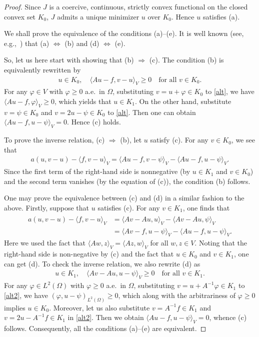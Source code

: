 \documentclass[reqno,10pt]{amsart}
\begin{document}
\begin{proof}
Since $J$ is a coercive, continuous, strictly convex
functional on the closed convex set $K_0$, $J$ admits a unique
minimizer $u$ over $K_0$. Hence $u$ satisfies (a). 

We shall prove the equivalence of the conditions (a)--(e).
It is well known (see, e.g.,~\cite{K-S80}) that (a) $\Leftrightarrow$
 (b) and (d) $\Leftrightarrow$ (e).

So, let us here start with showing that (b) $\Rightarrow$ (c). 
The condition (b) is equivalently rewritten by
\begin{align}\label{alt}
u\in K_0,
\quad
\langle Au-f,v-u\rangle_V \ge 0
\quad
\mbox{for all }v\in K_0.
\end{align}
For any $\varphi\in V$ with $\varphi\ge 0$ a.e.~in $\Omega$, 
substituting $v=u+\varphi\in K_0$ to \eqref{alt},
we have
$\langle Au-f,\varphi\rangle_V \ge 0$,
which yields that $u\in K_1$. 
On the other hand, substitute $v=\psi\in K_0$ and $v=2u-\psi\in K_0$ to
\eqref{alt}. Then one can obtain $\langle Au-f,u-\psi\rangle_V
=0$. Hence (c) holds.

To prove the inverse relation, (c) $\Rightarrow$ (b), 
let $u$ satisfy (c). For any $v\in K_0$, we see that
\begin{align*}
a(u,v-u)-\langle f,v-u\rangle_V
=
\langle Au-f,v-\psi\rangle_V
-\langle Au-f,u-\psi \rangle_V.
\end{align*}
Since the first term of the right-hand side is nonnegative (by $u \in
K_1$ and $v \in K_0$) and the second term vanishes (by the equation of (c)), the
condition (b) follows.

One may prove the equivalence between (c) and (d) in a similar fashion to
the above. Firstly, suppose that $u$ satisfies (c). For any
$v\in K_1$, one finds that
\begin{align*}
a(u,v-u)- \langle \hat{f},v-u\rangle_V
&= \langle Av - Au, u \rangle_V - \langle Av - Au, \psi \rangle_V\\
&= \langle Av-f,u-\psi\rangle_V
-\langle Au-f,u-\psi \rangle_V.
\end{align*}
Here we used the fact that $\langle Aw,z \rangle_V = \langle Az,w
 \rangle_V$ for all $w,z \in V$.
Noting that the right-hand side is non-negative by (c) and the fact that
 $u \in K_0$ and $v \in K_1$, one can get (d).
To check the inverse relation, we also rewrite (d) as
\begin{align}\label{alt2}
u\in K_1,
\quad
\langle Av-Au,u-\psi\rangle_V \ge 0
\quad
\mbox{for all }v\in K_1.
\end{align}
For any $\varphi\in L^2(\Omega)$ with $\varphi\ge 0$ a.e.~in $\Omega$, 
substituting $v=u+A^{-1}\varphi\in K_1$ to \eqref{alt2},
we have $(\varphi,u-\psi)_{L^2(\Omega)} \ge 0$, which along with the
arbitrariness of $\varphi \geq 0$ implies $u\in
K_0$. Moreover, let us also substitute $v=A^{-1}f\in K_1$ and
$v=2u-A^{-1}f\in K_1$ in \eqref{alt2}. Then we obtain
$\langle Au-f,u-\psi\rangle_V =0$, whence (c) follows.
Consequently, all the conditions (a)--(e) are equivalent.
\end{proof}
\end{document}
